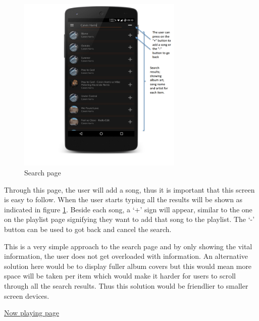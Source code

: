 \noindent
\begin{figure}[h!]
\centering
\includegraphics[width=0.7\textwidth]{./img/searchannotated.png}
\caption{Search page}
\label{fig:searchpage}
\end{figure}

Through this page, the user will add a song, thus it is important that this screen is easy to follow. When the user starts typing all the results will be shown as indicated in figure \ref{fig:searchpage}. Beside each song, a `+' sign will appear, similar to the one on the playlist page signifying they want to add that song to the playlist. The `-' button can be used to got back and cancel the search. 

This is a very simple approach to the search page and by only showing the vital information, the user does not get overloaded with information. An alternative solution here would be to display fuller album covers but this would mean more space will be taken per item which would make it harder for users to scroll through all the search results. Thus this solution would be friendlier to smaller screen devices.

\clearpage

\noindent\underline{Now playing page}\newline

